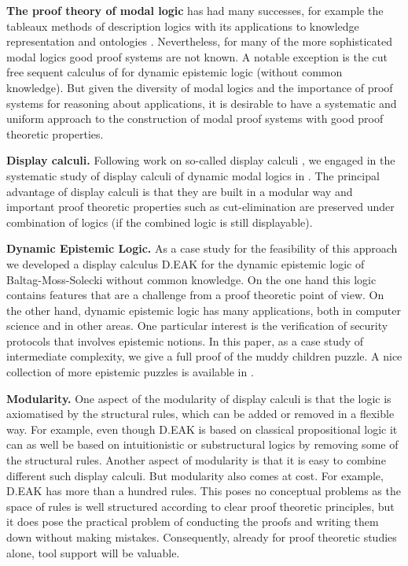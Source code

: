 \documentclass[runningheads,a4paper]{llncs}
\begin{document}
\medskip\noindent\textbf{The proof theory of modal logic} has had many successes, for example the tableaux methods of description logics with its applications to knowledge representation and ontologies \cite{mlhandbook:F,mlhandbook:HHSS,mlhandbook:BL}.
Nevertheless, for many of the more sophisticated modal logics good proof systems are not known. A notable exception is the cut free sequent calculus of \cite{Dyckhoff} for  dynamic epistemic logic  (without common knowledge). But given the diversity of modal logics and the importance of proof systems for reasoning about applications, it is desirable to have a systematic and uniform approach to the construction of modal proof systems with good proof theoretic properties.  

\medskip\noindent\textbf{Display calculi. } Following work on so-called display calculi \cite{Belnap,Kracht,Gore96,Wansing,Gore98}, we engaged
in the systematic study of display calculi of dynamic modal logics in \cite{DEAK,Multitype,PDL}. The principal advantage of display calculi is that they are built in a modular way and important proof theoretic properties such as cut-elimination are preserved under combination of logics (if the combined logic is still displayable). 

\medskip\noindent\textbf{Dynamic Epistemic Logic. } As a case study for the feasibility of this approach we developed a display calculus D.EAK for the  dynamic epistemic logic \cite{Ditmarsch} of Baltag-Moss-Solecki \cite{bms} without common knowledge. On the one hand this logic contains features that are a challenge from a proof theoretic point of view. On the other hand, dynamic epistemic logic has many applications, both in computer science and in other areas. One particular interest is the verification of security protocols that involves epistemic notions. In this paper, as a case study of intermediate complexity, we give a full proof of the muddy children puzzle. A nice collection of more epistemic puzzles is available in \cite{DitmarschK15}.



\medskip\noindent\textbf{Modularity. }
One aspect of the modularity of display calculi is that the logic is axiomatised by the structural rules, which can be added or removed in a flexible way. For example, even though D.EAK is based on classical propositional logic it can as well be based on intuitionistic or substructural logics by removing some of the structural rules. Another aspect of modularity is that it is easy to combine different such display calculi. But modularity also comes at cost. For example, D.EAK has more than a hundred rules. This poses no conceptual problems as the space of rules is well structured according to clear proof theoretic principles, but it does pose the practical problem of conducting the proofs and writing them down without making mistakes. Consequently, already for proof theoretic studies alone, tool support will be valuable.
\end{document}
